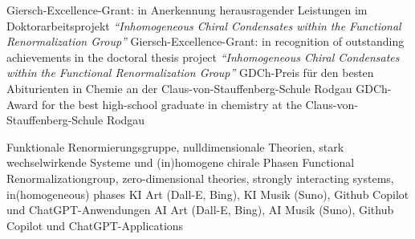 \documentclass[color=TUDa-1b]{komacv}
\begin{document}

\cvitem%
	{}%
	{\lang%
		{Giersch-Excellence-Grant: in Anerkennung herausragender Leistungen im Doktorarbeitsprojekt \textit{``Inhomogeneous Chiral Condensates within the Functional Renormalization Group''}}
		{Giersch-Excellence-Grant: in recognition of outstanding achievements in the doctoral thesis project \textit{``Inhomogeneous Chiral Condensates within the Functional Renormalization Group''}}
	}
\cvitem%
	{}
	{\lang%
		{GDCh-Preis für den besten Abiturienten in Chemie an der Claus-von-Stauffenberg-Schule Rodgau}
		{GDCh-Award for the best high-school graduate in chemistry at the Claus-von-Stauffenberg-Schule Rodgau}
	}



\cvitem%
	{}%
	{}
\cvitem%
	{}%
	{}
\cvitem%
	{}
	{\lang%
		{Funktionale Renormierungsgruppe, nulldimensionale Theorien, stark wechselwirkende Systeme und (in)homogene chirale Phasen}%
		{Functional Renormalizationgroup, zero-dimensional theories, strongly interacting systems, in(homogeneous) phases}
	}
\cvitem%
	{}
	{\lang%
		{KI Art (Dall-E, Bing), KI Musik (Suno), Github Copilot und ChatGPT-Anwendungen}%
		{AI Art (Dall-E, Bing), AI Musik (Suno), Github Copilot und ChatGPT-Applications}
	}
\end{document}
